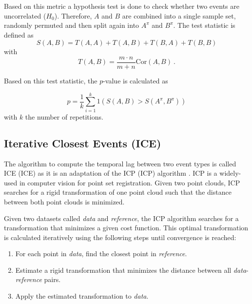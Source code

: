 \documentclass[conference]{IEEEtran}
\theoremstyle{examplestyle}
\begin{document}
Based on this metric a hypothesis test is done to check whether two events are uncorrelated (\(H_0\)).  Therefore, \(A\) and \(B\) are combined into a single sample set, randomly permuted and then split again into \(A^\pi\) and \(B^\pi\). The test statistic is defined as
\begin{equation}
	S(A, B) = T(A, A) + T(A, B) + T(B, A) + T(B, B)
\end{equation}
with
\begin{equation*}
	T(A, B) = \dfrac{m \cdot n}{m + n} \text{Cor}(A, B) ~.
\end{equation*}

Based on this test statistic, the \(p\)-value is calculated as

\begin{equation}
	p = \dfrac{1}{k} \sum_{i = 1}^k 1 \left( S(A, B) > S(A^\pi , B^\pi) \right)
\end{equation}
with \(k\) the number of repetitions.



\subsection{Iterative Closest Events (ICE)}
\label{sec:ice}

The algorithm to compute the temporal lag between two event types is called \acl{ICE} (\ac{ICE}) as it is an adaptation of the \acl{ICP} (\ac{ICP}) algorithm \cite{Besl1992}. \ac{ICP} is a widely-used in computer vision for point set registration. Given two point clouds, \ac{ICP} searches for a rigid transformation of one point cloud such that the distance between both point clouds is minimized. 

Given two datasets called \textit{data} and \textit{reference}, the \ac{ICP} algorithm searches for a transformation that minimizes a given cost function. This optimal transformation is calculated iteratively using the following steps \cite{Besl1992} until convergence is reached:

\begin{enumerate}
	\item For each point in \textit{data}, find the closest point in \textit{reference}.
	\item Estimate a rigid transformation that minimizes the distance between all \textit{data}-\textit{reference} pairs.
	\item Apply the estimated transformation to \textit{data}.
\end{enumerate}
\end{document}
